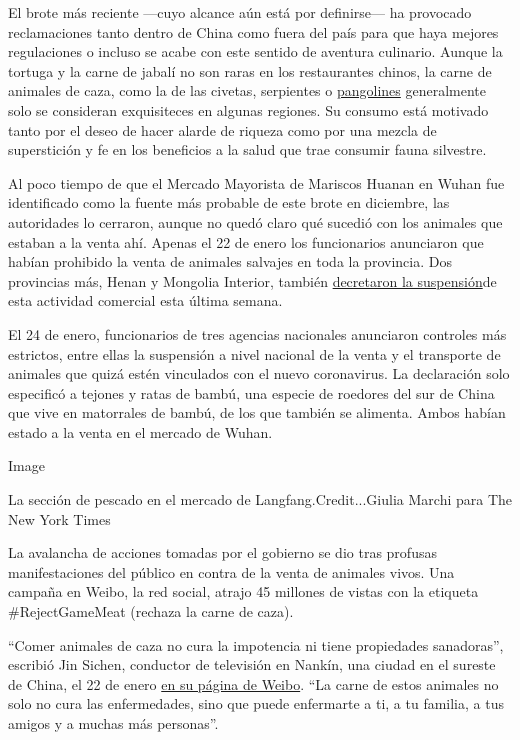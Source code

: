 El brote más reciente ---cuyo alcance aún está por definirse--- ha
provocado reclamaciones tanto dentro de China como fuera del país para
que haya mejores regulaciones o incluso se acabe con este sentido de
aventura culinario. Aunque la tortuga y la carne de jabalí no son raras
en los restaurantes chinos, la carne de animales de caza, como la de las
civetas, serpientes o
\href{https://www.nytimes.com/es/2019/04/09/espanol/comercio-especies-pangolin.html}{pangolines}
generalmente solo se consideran exquisiteces en algunas regiones. Su
consumo está motivado tanto por el deseo de hacer alarde de riqueza como
por una mezcla de superstición y fe en los beneficios a la salud que
trae consumir fauna silvestre.

Al poco tiempo de que el Mercado Mayorista de Mariscos Huanan en Wuhan
fue identificado como la fuente más probable de este brote en diciembre,
las autoridades lo cerraron, aunque no quedó claro qué sucedió con los
animales que estaban a la venta ahí. Apenas el 22 de enero los
funcionarios anunciaron que habían prohibido la venta de animales
salvajes en toda la provincia. Dos provincias más, Henan y Mongolia
Interior, también
\href{http://m.xinhuanet.com/2020-01/23/c_1125495548.htm}{decretaron la
suspensión}de esta actividad comercial esta última semana.

El 24 de enero, funcionarios de tres agencias nacionales anunciaron
controles más estrictos, entre ellas la suspensión a nivel nacional de
la venta y el transporte de animales que quizá estén vinculados con el
nuevo coronavirus. La declaración solo especificó a tejones y ratas de
bambú, una especie de roedores del sur de China que vive en matorrales
de bambú, de los que también se alimenta. Ambos habían estado a la venta
en el mercado de Wuhan.

Image

La sección de pescado en el mercado de Langfang.Credit...Giulia Marchi
para The New York Times

La avalancha de acciones tomadas por el gobierno se dio tras profusas
manifestaciones del público en contra de la venta de animales vivos. Una
campaña en Weibo, la red social, atrajo 45 millones de vistas con la
etiqueta \#RejectGameMeat (rechaza la carne de caza).

``Comer animales de caza no cura la impotencia ni tiene propiedades
sanadoras'', escribió Jin Sichen, conductor de televisión en Nankín, una
ciudad en el sureste de China, el 22 de enero
\href{https://www.weibo.com/1863716232/IqGcXwuXm?from=page_1005051863716232_profile\&wvr=6\&mod=weibotime\&type=comment}{en
su página de Weibo}. ``La carne de estos animales no solo no cura las
enfermedades, sino que puede enfermarte a ti, a tu familia, a tus amigos
y a muchas más personas''.


